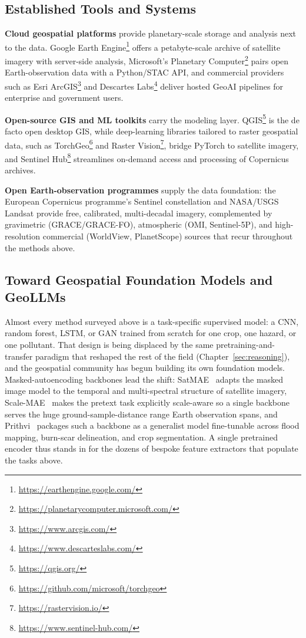 \subsection{Established Tools and Systems}
\label{subsec:p4-sec11-2-established-tools-and-systems}

\textbf{Cloud geospatial platforms} provide planetary-scale storage and analysis next to the data. Google Earth Engine\footnote{\url{https://earthengine.google.com/}} offers a petabyte-scale archive of satellite imagery with server-side analysis, Microsoft's Planetary Computer\footnote{\url{https://planetarycomputer.microsoft.com/}} pairs open Earth-observation data with a Python/STAC API, and commercial providers such as Esri ArcGIS\footnote{\url{https://www.arcgis.com/}} and Descartes Labs\footnote{\url{https://www.descarteslabs.com/}} deliver hosted GeoAI pipelines for enterprise and government users.

\textbf{Open-source GIS and ML toolkits} carry the modeling layer. QGIS\footnote{\url{https://qgis.org/}} is the de facto open desktop GIS, while deep-learning libraries tailored to raster geospatial data, such as TorchGeo\footnote{\url{https://github.com/microsoft/torchgeo}} and Raster Vision\footnote{\url{https://rastervision.io/}}, bridge PyTorch to satellite imagery, and Sentinel Hub\footnote{\url{https://www.sentinel-hub.com/}} streamlines on-demand access and processing of Copernicus archives.

\textbf{Open Earth-observation programmes} supply the data foundation: the European Copernicus programme's Sentinel constellation and NASA/USGS Landsat provide free, calibrated, multi-decadal imagery, complemented by gravimetric (GRACE/GRACE-FO), atmospheric (OMI, Sentinel-5P), and high-resolution commercial (WorldView, PlanetScope) sources that recur throughout the methods above.

\subsection{Toward Geospatial Foundation Models and GeoLLMs}
\label{subsec:p4-sec11-2-toward-geospatial-foundation-models-and-geollms}
Almost every method surveyed above is a task-specific supervised model: a CNN, random forest, LSTM, or GAN trained from scratch for one crop, one hazard, or one pollutant. That design is being displaced by the same pretraining-and-transfer paradigm that reshaped the rest of the field (Chapter~\ref{sec:reasoning}), and the geospatial community has begun building its own foundation models. Masked-autoencoding backbones lead the shift: SatMAE~\cite{cong2022satmae} adapts the masked image model to the temporal and multi-spectral structure of satellite imagery, Scale-MAE~\cite{reed2023scalemae} makes the pretext task explicitly scale-aware so a single backbone serves the huge ground-sample-distance range Earth observation spans, and Prithvi~\cite{jakubik2023foundation} packages such a backbone as a generalist model fine-tunable across flood mapping, burn-scar delineation, and crop segmentation. A single pretrained encoder thus stands in for the dozens of bespoke feature extractors that populate the tasks above.

